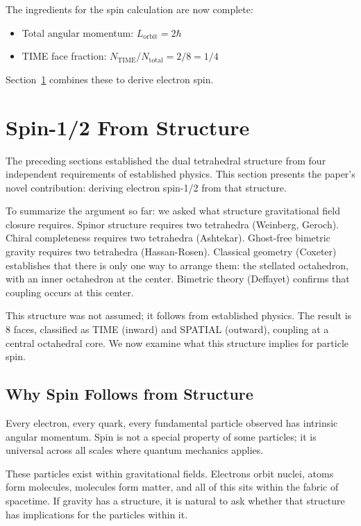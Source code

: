 \documentclass[aps,prd,preprint,superscriptaddress,showpacs,preprintnumbers,amsmath,amssymb,nofootinbib]{revtex4-2}
\begin{document}
The ingredients for the spin calculation are now complete:
\begin{itemize}
\item Total angular momentum: $L_{\text{orbit}} = 2\hbar$
\item TIME face fraction: $N_{\text{TIME}}/N_{\text{total}} = 2/8 = 1/4$
\end{itemize}

Section~\ref{sec:spin} combines these to derive electron spin.

\section{Spin-1/2 From Structure}
\label{sec:spin}

The preceding sections established the dual tetrahedral structure from four independent requirements of established physics. This section presents the paper's novel contribution: deriving electron spin-1/2 from that structure.

To summarize the argument so far: we asked what structure gravitational field closure requires. Spinor structure requires two tetrahedra (Weinberg, Geroch). Chiral completeness requires two tetrahedra (Ashtekar). Ghost-free bimetric gravity requires two tetrahedra (Hassan-Rosen). Classical geometry (Coxeter) establishes that there is only one way to arrange them: the stellated octahedron, with an inner octahedron at the center. Bimetric theory (Deffayet) confirms that coupling occurs at this center.

This structure was not assumed; it follows from established physics. The result is 8 faces, classified as TIME (inward) and SPATIAL (outward), coupling at a central octahedral core. We now examine what this structure implies for particle spin.

\subsection{Why Spin Follows from Structure}
\label{subsec:why-spin}

Every electron, every quark, every fundamental particle observed has intrinsic angular momentum. Spin is not a special property of some particles; it is universal across all scales where quantum mechanics applies.

These particles exist within gravitational fields. Electrons orbit nuclei, atoms form molecules, molecules form matter, and all of this sits within the fabric of spacetime. If gravity has a structure, it is natural to ask whether that structure has implications for the particles within it.
\end{document}
